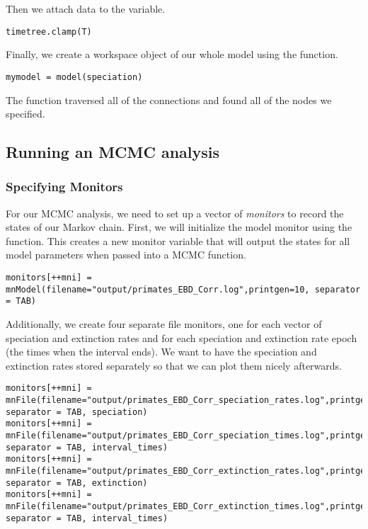 Then we attach data to the  variable.
{\tt \begin{snugshade*}
\begin{lstlisting}
timetree.clamp(T)
\end{lstlisting}
\end{snugshade*}}

Finally, we create a workspace object of our whole model using the  function. 
{\tt \begin{snugshade*}
\begin{lstlisting}
mymodel = model(speciation)
\end{lstlisting}
\end{snugshade*}}

The  function traversed all of the connections and found all of the nodes we specified. 


\subsection{Running an MCMC analysis}

\subsubsection{Specifying Monitors}

For our MCMC analysis, we need to set up a vector of \textit{monitors} to record the states of our Markov chain. 
First, we will initialize the model monitor using the  function. This creates a new monitor variable that will output the states for all model parameters when passed into a MCMC function. 
{\tt \begin{snugshade*}
\begin{lstlisting}
monitors[++mni] = mnModel(filename="output/primates_EBD_Corr.log",printgen=10, separator = TAB)
\end{lstlisting}
\end{snugshade*}}

Additionally, we create four separate file monitors, one for each vector of speciation and extinction rates and for each speciation and extinction rate epoch (\IE the times when the interval ends).
We want to have the speciation and extinction rates stored separately so that we can plot them nicely afterwards.
{\tt \begin{snugshade*}
\begin{lstlisting}
monitors[++mni] = mnFile(filename="output/primates_EBD_Corr_speciation_rates.log",printgen=10, separator = TAB, speciation)
monitors[++mni] = mnFile(filename="output/primates_EBD_Corr_speciation_times.log",printgen=10, separator = TAB, interval_times)
monitors[++mni] = mnFile(filename="output/primates_EBD_Corr_extinction_rates.log",printgen=10, separator = TAB, extinction)
monitors[++mni] = mnFile(filename="output/primates_EBD_Corr_extinction_times.log",printgen=10, separator = TAB, interval_times)
\end{lstlisting}
\end{snugshade*}}

